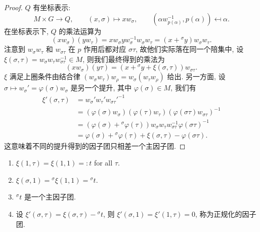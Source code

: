 \begin{proof}
$Q$ 有坐标表示:
\begin{equation}
M \times G \to Q, \qquad (x, \sigma) \mapsto xw_\sigma, \qquad
(\alpha w_{p(\alpha)}^{-1}, p(\alpha)) \mapsfrom \alpha.
\end{equation}
在坐标表示下, $Q$ 的乘法运算为
\begin{equation}
(xw_\sigma)(yw_\tau) = xw_\sigma y w_\sigma^{-1}w_\sigma w_\tau
                     = (x + {}^\sigma y)w_\sigma w_\tau.
\end{equation}
注意到 $w_\sigma w_\tau$ 和 $w_{\sigma\tau}$ 在 $p$ 作用后都对应 $\sigma\tau$,
故他们实际落在同一个陪集中,
设 $\xi(\sigma,\tau) = w_\sigma w_\tau w_{\sigma\tau}^{-1} \in M$,
则我们最终得到的乘法为
\begin{equation}
(xw_\sigma)(y\tau) = (x + {}^\sigma y + \xi(\sigma,\tau))w_{\sigma\tau}.
\end{equation}
$\xi$ 满足上圈条件由结合律 $(w_\sigma w_\tau)w_\rho = w_\sigma(w_\tau w_\rho)$ 给出.
另一方面, 设 $\sigma \mapsto w_\sigma' = \varphi(\sigma)w_\sigma$ 是另一个提升,
其中 $\varphi(\sigma) \in M$, 我们有
\begin{align*}
\xi'(\sigma,\tau) &= w_\sigma'w_\tau'w_{\sigma\tau}'^{-1}\\
                  &= (\varphi(\sigma)w_\sigma)(\varphi(\tau)w_\tau)(\varphi(\sigma\tau)w_{\sigma\tau})^{-1}\\
                  &= (\varphi(\sigma) + {}^\sigma\varphi(\tau))w_\sigma w_\tau w_{\sigma\tau}^{-1}\varphi(\sigma\tau)^{-1}\\
                  &= \varphi(\sigma) + {}^\sigma\varphi(\tau) + \xi(\sigma,\tau) - \varphi(\sigma\tau).
\end{align*}
这意味着不同的提升得到的因子团只相差一个主因子团.
\end{proof}

\begin{lem}[因子团的正规化]
\begin{enumerate}[label={\normalfont(\arabic*)}]
\item $\xi(1,\tau) = \xi(1,1) =: t$ for all $\tau$.
\item $\xi(\sigma, 1) = {}^\sigma\xi(1,1) = {}^\sigma t$.
\item ${}^\sigma t$ 是一个主因子团.
\item 设 $\xi'(\sigma, \tau) = \xi(\sigma, \tau) - {}^\sigma t$,
则 $\xi'(\sigma, 1) = \xi'(1, \tau) = 0$, 称为正规化的因子团.
\end{enumerate}
\end{lem}

